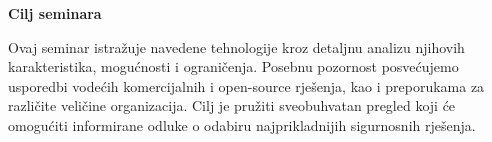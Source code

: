 \textbf{Cilj seminara}

Ovaj seminar istražuje navedene tehnologije kroz detaljnu analizu njihovih karakteristika, mogućnosti i ograničenja. Posebnu pozornost posvećujemo usporedbi vodećih komercijalnih i 
open-source rješenja, kao i preporukama za različite veličine organizacija. Cilj je pružiti sveobuhvatan pregled koji će omogućiti informirane odluke o odabiru najprikladnijih 
sigurnosnih rješenja.